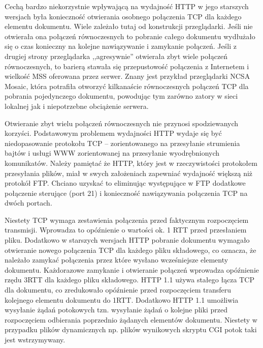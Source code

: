 Cechą bardzo niekorzystnie wpływającą na wydajność HTTP w jego starszych wersjach była konieczność otwierania 
osobnego połączenia TCP dla każdego elementu dokumentu. Wiele zależało tutaj od konstrukcji przeglądarki. Jeśli 
nie otwierała ona połączeń równoczesnych to pobranie całego dokumentu wydłużało się o czas konieczny na kolejne 
nawiązywanie i zamykanie połączeń. Jeśli z drugiej strony przeglądarka ,,agresywnie'' otwierała zbyt wiele 
połączeń równoczesnych, to barierą stawała się przepustowość połączenia z Internetem i wielkość MSS oferowana 
przez serwer. Znany jest przykład przeglądarki NCSA Mosaic, która potrafiła otworzyć kilkanaście równoczesnych 
połączeń TCP dla pobrania pojedynczego dokumentu, powodując tym zarówno zatory w sieci lokalnej jak i 
niepotrzebne obciążenie serwera. 

Otwieranie zbyt wielu połączeń równoczesnych nie przynosi spodziewanych korzyści. Podstawowym 
problemem wydajności HTTP wydaje się być niedopasowanie protokołu TCP -- zorientowanego na przesyłanie strumienia 
bajtów i usługi WWW zorientowanej na przesyłanie wyodrębnionych komunikatów. Należy pamiętać że HTTP, który jest 
w rzeczywistości protokołem przesyłania plików, miał w swych założeniach zapewniać wydajność większą niż 
protokół FTP. Chciano uzyskać to eliminując występujące w FTP dodatkowe połączenie sterujące (port 21) i 
konieczność nawiązywania połączenia TCP na dwóch portach. 

Niestety TCP wymaga zestawienia połączenia przed faktycznym rozpoczęciem transmisji. Wprowadza to opóźnienie o 
wartości ok. 1 RTT przed przesłaniem pliku. Dodatkowo w starszych wersjach HTTP pobranie dokumentu wymagało 
otwieranie nowego połączenia TCP dla każdego pliku składowego, co oznacza, że należało zamykać połączenia przez 
które wysłano wcześniejsze elementy dokumentu. Każdorazowe zamykanie i otwieranie połączeń wprowadza opóźnienie 
rzędu 3RTT dla każdego pliku składowego. HTTP 1.1 używa stałego łącza TCP dla dokumentu, co zredukowało 
opóźnienie przed rozpoczęciem transferu kolejnego elementu dokumentu do 1RTT. Dodatkowo HTTP 1.1 umożliwia 
wysyłanie żądań potokowych tzn. wysyłanie żądań o kolejne pliki przed rozpoczęciem odbierania poprzednio 
żądanych elementów dokumentu. Niestety w przypadku plików dynamicznych np. plików wynikowych skryptu CGI potok 
taki jest wstrzymywany. 